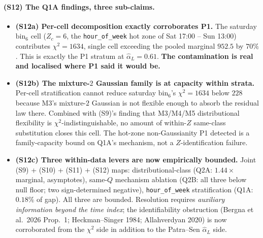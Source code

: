 \documentclass[11pt]{article}
\theoremstyle{definition}
\theoremstyle{plain}
\begin{document}
\paragraph{(S12) The Q1A findings, three sub-claims.}
\begin{itemize}[leftmargin=2em]
\item \textbf{(S12a) Per-cell decomposition exactly corroborates
P1.} The saturday $\mathrm{bin}_6$ cell ($Z_c = 6$, the
\texttt{hour\_of\_week} hot zone of Sat 17:00 -- Sun 13:00)
contributes $\chi^2 = 1634$, single cell exceeding the pooled
marginal $952.5$ by $70\%$. This is exactly the P1 stratum at
$\hat\alpha_L = 0.61$. \textbf{The contamination is real and
localised where P1 said it would be.}

\item \textbf{(S12b) The mixture-$2$ Gaussian family is at
capacity within strata.} Per-cell stratification cannot reduce
saturday $\mathrm{bin}_6$'s $\chi^2 = 1634$ below $228$ because
M3's mixture-$2$ Gaussian is not flexible enough to absorb the
residual law there. Combined with (S9)'s finding that M3/M4/M5
distributional flexibility is $\chi^2$-indistinguishable, no
amount of within-$Z$ same-class substitution closes this cell.
The hot-zone non-Gaussianity P1 detected is a family-capacity
bound on Q1A's mechanism, not a $Z$-identification failure.

\item \textbf{(S12c) Three within-data levers are now empirically
bounded.} Joint (S9) + (S10) + (S11) + (S12) maps:
distributional-class (Q2A: $1.44\times$ marginal, asymptotes),
same-$Q$ mechanism ablation (Q2B: all three below null floor;
two sign-determined negative), \texttt{hour\_of\_week} stratification
(Q1A: $0.18\%$ of gap). All three are bounded. Resolution requires
\emph{auxiliary information beyond the time index}; the
identifiability obstruction (Bergna et al.\ 2026 Prop.~1;
Heckman--Singer 1984; Allahverdyan 2020) is now corroborated from
the $\chi^2$ side in addition to the Patra--Sen $\hat\alpha_L$
side.
\end{itemize}
\end{document}
